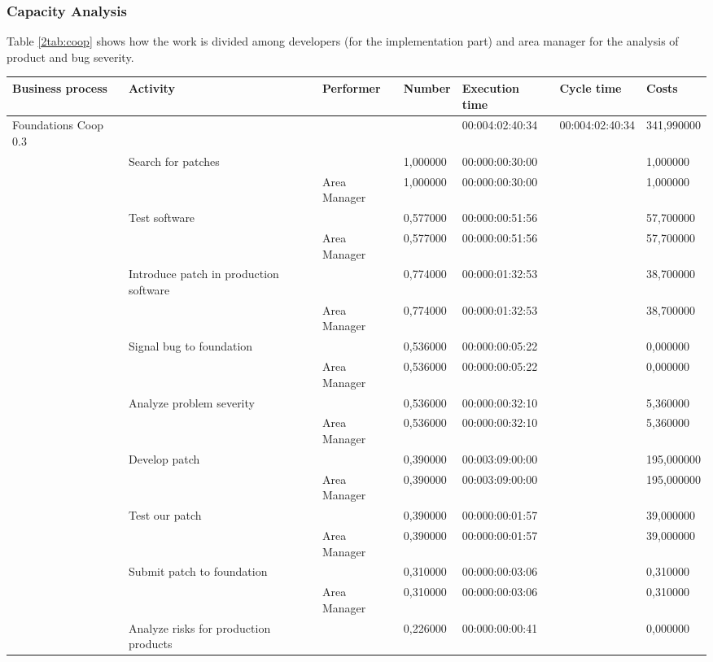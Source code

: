 \subsubsection{Capacity Analysis}
Table \ref{2tab:coop} shows how the work is divided among developers (for
the implementation part) and area manager for the analysis of product and
bug severity.

\begin{landscape}
\centering
\begin{table}
{\tiny
\begin{tabular}{|l|l|l|l|l|l|l|}
Business process&Activity&Performer&Number&Execution time&Cycle
time&Costs\\
\hline
Foundations Coop 0.3&&&&00:004:02:40:34&00:004:02:40:34&341,990000\\
\hline
&Search for patches &&1,000000&00:000:00:30:00&&1,000000\\
\hline
&&Area Manager &1,000000&00:000:00:30:00&&1,000000\\
\hline
&Test software &&0,577000&00:000:00:51:56&&57,700000\\
\hline
&&Area Manager &0,577000&00:000:00:51:56&&57,700000\\
\hline
&Introduce patch in production software &&0,774000&00:000:01:32:53&&38,700000\\
\hline
&&Area Manager &0,774000&00:000:01:32:53&&38,700000\\
\hline
&Signal bug to foundation &&0,536000&00:000:00:05:22&&0,000000\\
\hline
&&Area Manager &0,536000&00:000:00:05:22&&0,000000\\
\hline
&Analyze problem severity &&0,536000&00:000:00:32:10&&5,360000\\
\hline
&&Area Manager &0,536000&00:000:00:32:10&&5,360000\\
\hline
&Develop patch &&0,390000&00:003:09:00:00&&195,000000\\
\hline
&&Area Manager &0,390000&00:003:09:00:00&&195,000000\\
\hline
&Test our patch &&0,390000&00:000:00:01:57&&39,000000\\
\hline
&&Area Manager &0,390000&00:000:00:01:57&&39,000000\\
\hline
&Submit patch to foundation &&0,310000&00:000:00:03:06&&0,310000\\
\hline
&&Area Manager &0,310000&00:000:00:03:06&&0,310000\\
\hline
&Analyze risks for production products &&0,226000&00:000:00:00:41&&0,000000\\

\end{tabular}}
\end{table}
\end{landscape}
